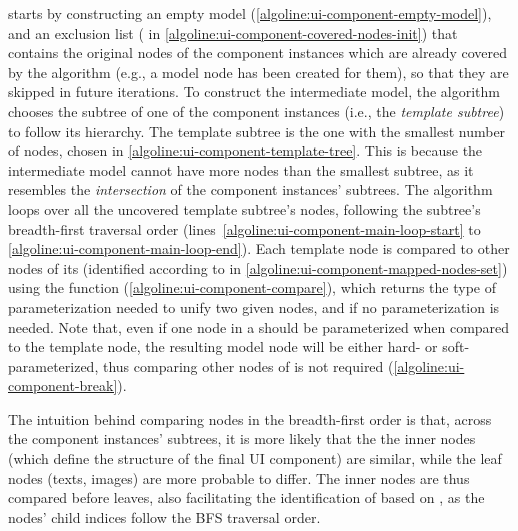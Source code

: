  starts by constructing an empty model (\cref{algoline:ui-component-empty-model}),
and an exclusion list ( in \cref{algoline:ui-component-covered-nodes-init})
that contains the original \dom nodes of the component instances which are already covered by the algorithm
(e.g., a model node has been created for them),
so that they are skipped in future iterations.
To construct the intermediate model,
the algorithm chooses the \dom subtree of one of the component instances
(i.e., the \emph{template subtree}) to follow its hierarchy.
The template subtree is the one with the smallest number of \dom nodes,
chosen in \cref{algoline:ui-component-template-tree}.
This is because the intermediate model cannot have more  \dom nodes than the smallest subtree,
as it resembles the \textit{intersection} of the component instances' \dom subtrees.
The algorithm loops over all the uncovered template subtree's \dom nodes,
following the subtree's breadth-first traversal order
(lines~\ref{algoline:ui-component-main-loop-start} to \ref{algoline:ui-component-main-loop-end}).
Each template \dom node 
is compared to other \dom nodes of its \mappedset (identified according to 
in \cref{algoline:ui-component-mapped-nodes-set})
using the  function (\cref{algoline:ui-component-compare}),
which returns the type of parameterization needed to unify two given \dom nodes,
and  if no parameterization is needed.
Note that, even if one node in a \mappedset should be parameterized 
when compared to the template \dom node, 
the resulting model node will be either hard- or soft-parameterized,
thus comparing other nodes of \mappedset is not required
(\cref{algoline:ui-component-break}).

The intuition behind comparing nodes in the breadth-first order is that,
across the component instances' \dom subtrees, it is more likely that the the inner nodes (which define the structure of the final UI component) 
are similar,
while the leaf nodes (texts, images) are more probable to differ.
The inner nodes are thus compared before leaves,
also facilitating the identification of \mappedset based on ,
as the nodes' child indices follow the BFS traversal order. 

